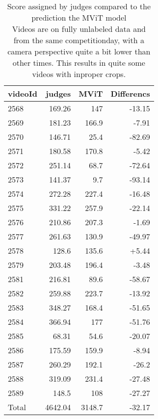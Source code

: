 \begin{table}[h!]
    \begin{tabular}{|l|r|r|r|}
        \hline
        videoId & judges    & MViT         & Differencs \\ \hline
        2568	& 169.26	&   147	       & -13.15 \\
        2569	& 181.23	&   166.9	   & -7.91  \\
        2570	& 146.71	&   25.4	   & -82.69 \\
        2571	& 180.58	&   170.8	   & -5.42  \\
        2572	& 251.14	&   68.7       & -72.64 \\
        2573	& 141.37	&   9.7	       & -93.14 \\
        2574	& 272.28	&   227.4	   & -16.48 \\
        2575	& 331.22	&   257.9	   & -22.14 \\
        2576	& 210.86	&   207.3	   & -1.69  \\
        2577	& 261.63	&   130.9	   & -49.97 \\
        2578	& 128.6	    &   135.6	   & +5.44  \\
        2579	& 203.48	&   196.4	   & -3.48  \\
        2581	& 216.81	&   89.6	   & -58.67 \\
        2582	& 259.88	&   223.7	   & -13.92 \\
        2583	& 348.27	&   168.4	   & -51.65 \\
        2584	& 366.94	&   177 	   & -51.76 \\
        2585	& 68.31	    &   54.6	   & -20.07 \\
        2586	& 175.59	&   159.9	   & -8.94  \\
        2587	& 260.29	&   192.1	   & -26.2  \\
        2588	& 319.09	&   231.4	   & -27.48 \\
        2589	& 148.5	    &   108 	   & -27.27 \\ \hline
        Total   & 4642.04	&   3148.7	   & -32.17 \\ \hline
    \end{tabular}
    \caption[judge diff score compared to MViT]{Score assigned by judges compared to the prediction the MViT model \\
    Videos are on fully unlabeled data and from the same competitionday, with a camera perspective quite a bit lower than other times.
    This results in quite some videos with inproper crops.}
    \label{tbl:judge-score-comparison}
\end{table}

